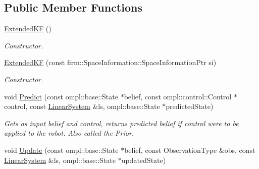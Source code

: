 \subsection*{\-Public \-Member \-Functions}
\begin{DoxyCompactItemize}
\item 
\hypertarget{class_extended_k_f_ab97e8270ba3204edacd21a4915d913a4}{\hyperlink{class_extended_k_f_ab97e8270ba3204edacd21a4915d913a4}{\-Extended\-K\-F} ()}\label{class_extended_k_f_ab97e8270ba3204edacd21a4915d913a4}

\begin{DoxyCompactList}\small\item\em \-Constructor. \end{DoxyCompactList}\item 
\hypertarget{class_extended_k_f_a392fec3a87814237dea8d40e319ee670}{\hyperlink{class_extended_k_f_a392fec3a87814237dea8d40e319ee670}{\-Extended\-K\-F} (const firm\-::\-Space\-Information\-::\-Space\-Information\-Ptr si)}\label{class_extended_k_f_a392fec3a87814237dea8d40e319ee670}

\begin{DoxyCompactList}\small\item\em \-Constructor. \end{DoxyCompactList}\item 
\hypertarget{class_extended_k_f_aa622a74dcda7a4abb78334df8c850a3e}{void \hyperlink{class_extended_k_f_aa622a74dcda7a4abb78334df8c850a3e}{\-Predict} (const ompl\-::base\-::\-State $\ast$belief, const ompl\-::control\-::\-Control $\ast$control, const \hyperlink{class_linear_system}{\-Linear\-System} \&ls, ompl\-::base\-::\-State $\ast$predicted\-State)}\label{class_extended_k_f_aa622a74dcda7a4abb78334df8c850a3e}

\begin{DoxyCompactList}\small\item\em \-Gets as input belief and control, returns predicted belief if control were to be applied to the robot. \-Also called the \-Prior. \end{DoxyCompactList}\item 
\hypertarget{class_extended_k_f_ae89c058d2f53b4740957d3234110ad50}{void \hyperlink{class_extended_k_f_ae89c058d2f53b4740957d3234110ad50}{\-Update} (const ompl\-::base\-::\-State $\ast$belief, const \-Observation\-Type \&obs, const \hyperlink{class_linear_system}{\-Linear\-System} \&ls, ompl\-::base\-::\-State $\ast$updated\-State)}\label{class_extended_k_f_ae89c058d2f53b4740957d3234110ad50}


\end{DoxyCompactItemize}
